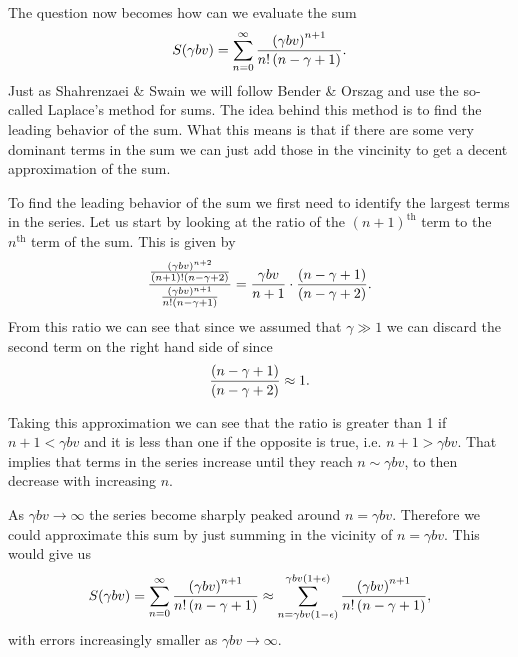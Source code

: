 The question now becomes how can we evaluate the sum
\begin{equation}
  S(\gamma b v) = \sum_{n=0}^\infty {\left( \gamma b v \right)^{n+1} \over
  n! \left( n - \gamma + 1 \right)}.
\end{equation}
Just as Shahrenzaei \& Swain we will follow Bender \& Orszag and use the
so-called Laplace's method for sums. The idea behind this method is to find the
leading behavior of the sum. What this means is that if there are some very
dominant terms in the sum we can just add those in the vincinity to get a decent
approximation of the sum.

To find the leading behavior of the sum we first need to identify the largest
terms in the series. Let us start by looking at the ratio of the
$(n+1)^{\text{th}}$ term to the $n^{\text{th}}$ term of the sum. This is given
by
\begin{equation}
{{(\gamma b v)^{n+2} \over (n+1)! (n - \gamma + 2)}
\over
{(\gamma b v)^{n+1} \over n! (n - \gamma + 1)}}
=
{\gamma b v \over n + 1} \cdot
{(n - \gamma + 1) \over (n - \gamma + 2)}.
\label{eq_ratio_series}
\end{equation}
From this ratio we can see that since we assumed that $\gamma \gg 1$ we can
discard the second term on the right hand side of  since
\begin{equation}
{(n - \gamma + 1) \over (n - \gamma + 2)} \approx 1.
\end{equation}

Taking this approximation we can see that the ratio is greater than 1 if
$n + 1 < \gamma b v$ and it is less than one if the opposite is true, i.e.
$n + 1 > \gamma b v$. That implies that terms in the series increase until they
reach $n \sim \gamma b v$, to then decrease with increasing $n$.

As $\gamma b v \rightarrow \infty$ the series become sharply peaked around
$n = \gamma b v$. Therefore we could approximate this sum by just summing in the
vicinity of $n = \gamma b v$. This would give us
\begin{align}
  S(\gamma b v) =
\sum_{n=0}^\infty {\left( \gamma b v \right)^{n+1} \over
  n! \left( n - \gamma + 1 \right)} \approx
\sum_{n=\gamma b v (1 - \epsilon)}
    ^{\gamma b v (1 + \epsilon)}
    {\left( \gamma b v \right)^{n+1} \over
  n! \left( n - \gamma + 1 \right)},
\end{align}
with errors increasingly smaller as $\gamma b v \rightarrow \infty$.

